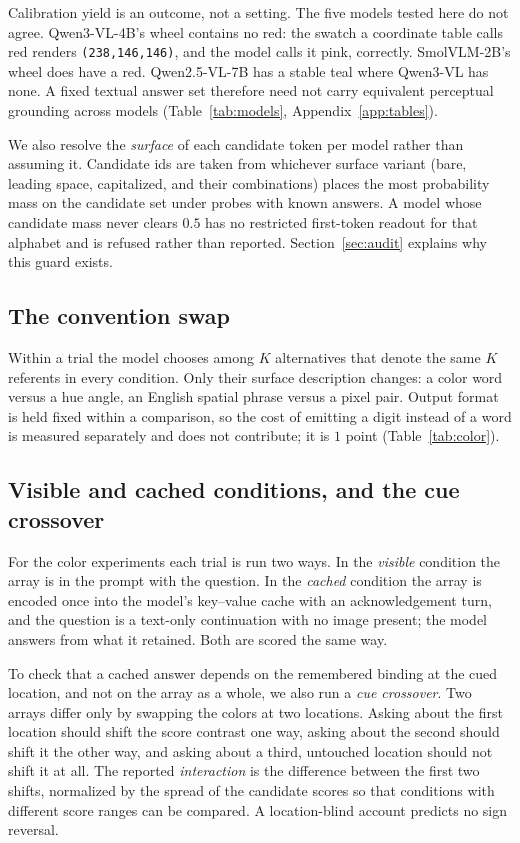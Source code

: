 \documentclass{article}
\begin{document}
Calibration yield is an outcome, not a setting. The five models tested here do not
agree. Qwen3-VL-4B's wheel contains no red: the swatch a coordinate table calls
red renders \texttt{(238,146,146)}, and the model calls it pink, correctly.
SmolVLM-2B's wheel does have a red. Qwen2.5-VL-7B has a stable teal where
Qwen3-VL has none. A fixed
textual answer set therefore need not carry equivalent perceptual grounding across
models (Table~\ref{tab:models}, Appendix~\ref{app:tables}).

We also resolve the \emph{surface} of each candidate token per model rather than
assuming it. Candidate ids are taken from whichever surface variant (bare, leading space,
capitalized, and their combinations) places the most probability mass on the
candidate set under probes with known answers. A model whose candidate mass never
clears $0.5$ has no restricted first-token readout for that alphabet and is refused
rather than reported. Section~\ref{sec:audit} explains why this guard exists.

\subsection{The convention swap}

Within a trial the model chooses among $K$ alternatives that denote the same $K$
referents in every condition. Only their surface description changes: a color word
versus a hue angle, an English spatial phrase versus a pixel pair. Output format is
held fixed within a comparison, so the cost of emitting a digit instead of a word
is measured separately and does not contribute; it is $1$ point
(Table~\ref{tab:color}).

\subsection{Visible and cached conditions, and the cue crossover}
\label{sec:crossover}

For the color experiments each trial is run two ways. In the \emph{visible}
condition the array is in the prompt with the question. In the \emph{cached}
condition the array is encoded once into the model's key--value cache with an
acknowledgement turn, and the question is a text-only continuation with no image
present; the model answers from what it retained. Both are scored the same way.

To check that a cached answer depends on the remembered binding at the cued
location, and not on the array as a whole, we also run a \emph{cue crossover}.
Two arrays differ only by swapping the colors at two locations. Asking about the
first location should shift the score contrast one way, asking about the second
should shift it the other way, and asking about a third, untouched location should
not shift it at all. The reported \emph{interaction} is the difference between the
first two shifts, normalized by the spread of the candidate scores so that
conditions with different score ranges can be compared. A location-blind account
predicts no sign reversal.
\end{document}
